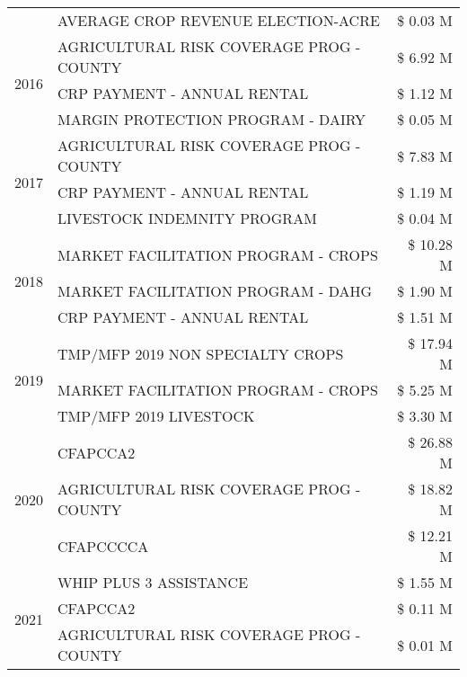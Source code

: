\begin{tabular}{llr}
 & AVERAGE CROP REVENUE ELECTION-ACRE & \$ 0.03 M \\
\cline{1-3}
\multirow[t]{3}{*}{2016} & AGRICULTURAL RISK COVERAGE PROG - COUNTY & \$ 6.92 M \\
 & CRP PAYMENT - ANNUAL RENTAL & \$ 1.12 M \\
 & MARGIN PROTECTION PROGRAM - DAIRY & \$ 0.05 M \\
\cline{1-3}
\multirow[t]{3}{*}{2017} & AGRICULTURAL RISK COVERAGE PROG - COUNTY & \$ 7.83 M \\
 & CRP PAYMENT - ANNUAL RENTAL & \$ 1.19 M \\
 & LIVESTOCK INDEMNITY PROGRAM & \$ 0.04 M \\
\cline{1-3}
\multirow[t]{3}{*}{2018} & MARKET FACILITATION PROGRAM - CROPS & \$ 10.28 M \\
 & MARKET FACILITATION PROGRAM - DAHG & \$ 1.90 M \\
 & CRP PAYMENT - ANNUAL RENTAL & \$ 1.51 M \\
\cline{1-3}
\multirow[t]{3}{*}{2019} & TMP/MFP 2019 NON SPECIALTY CROPS & \$ 17.94 M \\
 & MARKET FACILITATION PROGRAM - CROPS & \$ 5.25 M \\
 & TMP/MFP 2019 LIVESTOCK & \$ 3.30 M \\
\cline{1-3}
\multirow[t]{3}{*}{2020} & CFAPCCA2 & \$ 26.88 M \\
 & AGRICULTURAL RISK COVERAGE PROG - COUNTY & \$ 18.82 M \\
 & CFAPCCCCA & \$ 12.21 M \\
\cline{1-3}
\multirow[t]{3}{*}{2021} & WHIP PLUS 3 ASSISTANCE & \$ 1.55 M \\
 & CFAPCCA2 & \$ 0.11 M \\
 & AGRICULTURAL RISK COVERAGE PROG - COUNTY & \$ 0.01 M \\
\cline{1-3}
\bottomrule
\end{tabular}

